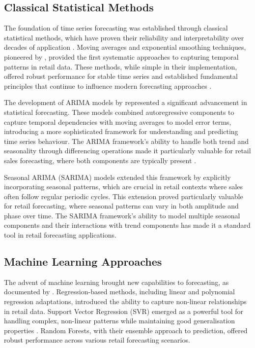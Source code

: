 \documentclass[12pt,a4paper]{report}
\begin{document}
\subsection{Classical Statistical Methods}

The foundation of time series forecasting was established through classical statistical methods, which have proven their reliability and interpretability over decades of application \citep{hyndman2018forecasting}. Moving averages and exponential smoothing techniques, pioneered by \citet{winters1960forecasting}, provided the first systematic approaches to capturing temporal patterns in retail data. These methods, while simple in their implementation, offered robust performance for stable time series and established fundamental principles that continue to influence modern forecasting approaches \citep{james2013introduction}.

The development of ARIMA models by \citet{box2015time} represented a significant advancement in statistical forecasting. These models combined autoregressive components to capture temporal dependencies with moving averages to model error terms, introducing a more sophisticated framework for understanding and predicting time series behaviour. The ARIMA framework's ability to handle both trend and seasonality through differencing operations made it particularly valuable for retail sales forecasting, where both components are typically present \citep{makridakis2022statistical}.

Seasonal ARIMA (SARIMA) models extended this framework by explicitly incorporating seasonal patterns, which are crucial in retail contexts where sales often follow regular periodic cycles. This extension proved particularly valuable for retail forecasting, where seasonal patterns can vary in both amplitude and phase over time. The SARIMA framework's ability to model multiple seasonal components and their interactions with trend components has made it a standard tool in retail forecasting applications.

\subsection{Machine Learning Approaches}

The advent of machine learning brought new capabilities to forecasting, as documented by \citet{chen2016xgboost}. Regression-based methods, including linear and polynomial regression adaptations, introduced the ability to capture non-linear relationships in retail data. Support Vector Regression (SVR) emerged as a powerful tool for handling complex, non-linear patterns while maintaining good generalisation properties \citep{borovykh2017conditional}. Random Forests, with their ensemble approach to prediction, offered robust performance across various retail forecasting scenarios.
\end{document}
